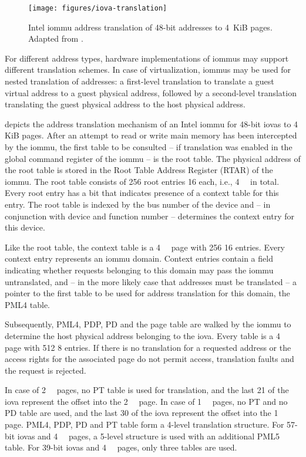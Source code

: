 \begin{figure}[!b]
    \centering
    \texttt{[image: figures/iova-translation]}
    \caption{Intel \acs{iommu} address translation of 48-bit addresses to 4~KiB
    pages. Adapted from \cite{morgan2018iommu}.}
    \label{fig:translation}
\end{figure}

For different address types, hardware implementations of \acp{iommu} may support
different translation schemes. In case of virtualization, \acp{iommu} may be
used for nested translation of addresses: a first-level translation to translate
a guest virtual address to a guest physical address, followed by a second-level
translation translating the guest physical address to the host physical address.

 depicts the address translation mechanism of an Intel
\ac{iommu} for 48-bit \acp{iova} to 4 KiB pages. After an attempt to read or
write main memory has been intercepted by the \ac{iommu}, the first table to be
consulted -- if translation was enabled in the global command register of the
\ac{iommu} -- is the root table. The physical address of the root table is
stored in the Root Table Address Register (RTAR) of the \ac{iommu}. The root
table consists of 256 root entries \SI{16}{\byte} each, i.e., \SI{4}{\kibi\byte}
in total. Every root entry has a bit that indicates presence of a context table
for this entry. The root table is indexed by the bus number of the device and --
in conjunction with device and function number -- determines the context entry
for this device.

Like the root table, the context table is a \SI{4}{\kibi\byte} page with 256
\SI{16}{\byte} entries. Every context entry represents an \ac{iommu} domain.
Context entries contain a field indicating whether requests belonging to this
domain may pass the \ac{iommu} untranslated, and -- in the more likely case that
addresses must be translated -- a pointer to the first table to be used for
address translation for this domain, the PML4 table.

Subsequently, PML4, PDP, PD and the page table are walked by the \ac{iommu} to
determine the host physical address belonging to the \ac{iova}. Every table is a
\SI{4}{\kibi\byte} page with 512 \SI{8}{\byte} entries. If there is no
translation for a requested address or the access rights for the associated page
do not permit access, translation faults and the request is rejected.

In case of \SI{2}{\mebi\byte} pages, no PT table is used for translation, and
the last \SI{21}{\bit} of the \ac{iova} represent the offset into the
\SI{2}{\mebi\byte} page. In case of \SI{1}{\gibi\byte} pages, no PT and no PD
table are used, and the last \SI{30}{\bit} of the \ac{iova} represent the offset
into the \SI{1}{\gibi\byte} page. PML4, PDP, PD and PT table form a 4-level
translation structure. For 57-bit \acp{iova} and \SI{4}{\kibi\byte} pages, a
5-level structure is used with an additional PML5 table. For 39-bit \acp{iova}
and \SI{4}{\kibi\byte} pages, only three tables are used.

